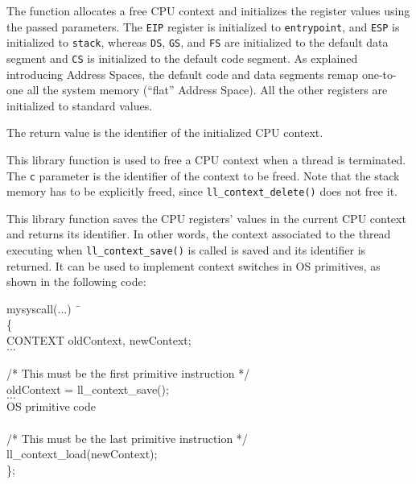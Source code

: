 \documentclass[a4paper]{report}
\begin{document}
The function allocates a free CPU context and initializes the
register values using the passed parameters. The {\tt EIP} register
is initialized to {\tt entrypoint}, and {\tt ESP} is initialized
to {\tt stack}, whereas {\tt DS}, {\tt GS}, and {\tt FS} are
initialized to the default data segment and {\tt CS} is initialized to
the default code segment. As explained introducing Address Spaces, the
default code and data segments remap one-to-one all the system memory
(``flat'' Address Space). All the other registers are initialized to
standard values.

The return value is the  identifier of the initialized CPU context.


This library function is used to free a CPU context when a thread is
terminated. The {\tt c} parameter is the identifier of the context to
be freed. Note that the stack memory has to be explicitly freed, since
{\tt ll\_context\_delete()} does not free it.


This library function saves the CPU registers' values in the current
CPU context and returns its identifier. In other words, the context
associated to the thread executing when {\tt ll\_context\_save()} is
called is saved and its identifier is returned. It can be used to
implement context switches in OS primitives, as shown in the
following code:

\begin{minipage}[t]{15cm}
\begin{tt}
\begin{tabbing}
mysyscall(...) \=\                             \\
\{                                                      \\
\>      CONTEXT oldContext, newContext;                 \\
\>      $\ldots$                                        \\
							\\
/* This must be the first primitive instruction */      \\
\>      oldContext = ll\_context\_save();               \\
\>      $\ldots$                                        \\
\>	OS primitive code				\\
							\\
/* This must be the last primitive instruction */       \\
\>      ll\_context\_load(newContext);                  \\
\};                                                     \\
\end{tabbing}
\end{tt}
\end{minipage}
\end{document}
